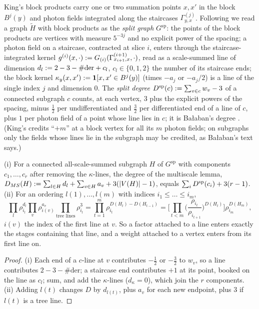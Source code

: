 King's block products \cite[(3.24)$\times$(3.26), (3.25)$\times$(3.26), (3.26)$\times$(3.26)]{K1} carry one or two summation points $x,x'$ in the block $B^j(y)$ and photon fields integrated along the staircases $\Gamma^{(j)}_{y,x}$. Following \cite[(1.13)--(1.15), (2.1)--(2.2), (2.12)--(2.14)]{Ba3} we read a graph $\tilde H$ with block products as the \emph{split graph} $G^{\mathrm{sp}}$: the points of the block products are vertices with measure $5^{-3j}$ and no explicit power of the spacing; a photon field on a staircase, contracted at slice $i$, enters through the staircase-integrated kernel $g^{(i)}(x,\cdot):= G_{(i)}(\Gamma^{(i+1)}_{x_{i+1},x},\cdot)$, read as a scale-summed line of dimension $d_l:=2-3-\#\text{der}+c_l$, $c_l\in\{0,1,2\}$ the number of its staircase ends; the block kernel $\kappa_y(x,x'):=\mathbf 1[x,x'\in B^j(y)]$ (times $-a_j$ or $-a_j/2$) is a line of the single index $j$ and dimension $0$. The \emph{split degree} $D^{\mathrm{sp}}(c):=\sum_{v\in c}w_v-3$ of a connected subgraph $c$ counts, at each vertex, $3$ plus the explicit powers of the spacing, minus $\frac12$ per undifferentiated and $\frac32$ per differentiated end of a line of $c$, plus $1$ per photon field of a point whose line lies in $c$; it is Ba{\l}aban's degree \cite[(2.1)--(2.2)]{Ba3}. (King's \cite[(3.30)]{K1} credits ``$+m$'' at a block vertex for all its $m$ photon fields; on subgraphs only the fields whose lines lie in the subgraph may be credited, as Ba{\l}aban's text says.)

\begin{lemma}\label{lem:a02:Dsp}
(i) For a connected all-scale-summed subgraph $H$ of $G^{\mathrm{sp}}$ with components $c_1,\dots,c_r$ after removing the $\kappa$-lines, the degree of the multiscale lemma, $D_{MS}(H):=\sum_{l\in H}d_l+\sum_{v\in H}a_v+3(|V(H)|-1)$, equals $\sum_iD^{\mathrm{sp}}(c_i)+3(r-1)$. (ii) For an ordering $l(1),\dots,l(m)$ with indices $i_1\le\dots\le i_m$,
\[
\prod_l\rho_{i_l}^{d_l}\prod_v\rho_{i(v)}^{a_v}\prod_{\text{tree lines}}\rho_{i_l}^{3}=\prod_{t=1}^m\rho_{i_t}^{D(H_t)-D(H_{t-1})}=\Big[\prod_{t<m}\Big(\frac{\rho_{i_t}}{\rho_{i_{t+1}}}\Big)^{D(H_t)}\Big]\rho_{i_m}^{D(H_m)},
\]
$i(v)$ the index of the first line at $v$. So a factor attached to a line enters exactly the stages containing that line, and a weight attached to a vertex enters from its first line on.
\end{lemma}
\begin{proof}
(i) Each end of a $c$-line at $v$ contributes $-\frac12$ or $-\frac32$ to $w_v$, so a line contributes $2-3-\#\text{der}$; a staircase end contributes $+1$ at its point, booked on the line as $c_l$; sum, and add the $\kappa$-lines ($d_\kappa=0$), which join the $r$ components. (ii) Adding $l(t)$ changes $D$ by $d_{l(t)}$, plus $a_v$ for each new endpoint, plus $3$ if $l(t)$ is a tree line.
\end{proof}

